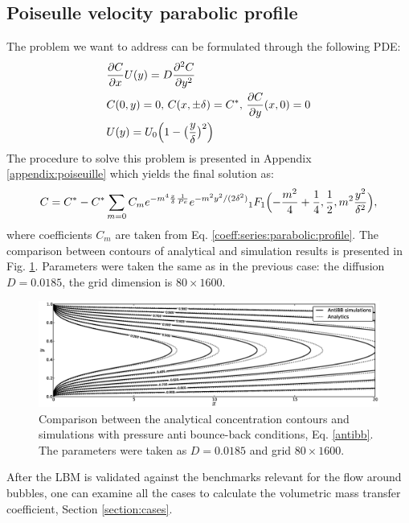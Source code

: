 \documentclass{article}
\newcommand{\beq}{\begin{equation}}
\newcommand{\feq}{\end{equation}}
\newcommand{\cstar}{C^{*}}
\begin{document}
\subsection{Poiseulle velocity parabolic profile}
The problem we want to address can be formulated through the following PDE:
\beq
\begin{aligned}
&\frac{\partial C}{\partial x} U(y)=D\frac{\partial^2 C}{\partial y^2}\\
&C(0,y)=0,\, C(x,\pm \delta)=\cstar,\, \frac{\partial C}{\partial y }(x,0)=0\\
&U(y)=U_0 \Bigl(1-\bigl(\frac{y}{\delta}\bigr)^2\Bigr)
\end{aligned}
\feq
The procedure to solve this problem is presented in Appendix \ref{appendix:poiseuille} which yields
the final solution as:
\begin{equation}
C=\cstar-\cstar \sum_{m=0}{C_m e^{-m^4 \frac{x}{\delta}\frac{1}{Pe}} e^{-m^2
y^2/(2\delta^2)}{_1F_1}\Bigl(-\frac{m^2}{4}+\frac{1}{4},\frac{1}{2},m^2 \frac{y^2}{\delta^2}\Bigr)},
\end{equation}
where coefficients $C_m$ are taken from Eq. \ref{coeff:series:parabolic:profile}. The comparison
between contours of analytical and simulation results is presented in Fig.
\ref{fig:parabolic:comparison}. Parameters were taken the same as in the previous case: the
diffusion $D=0.0185$, the grid dimension is $80\times1600$. 
\begin{figure}[htb!]
\includegraphics[width=\textwidth]{Figures/parabolic_profile_comparison.eps}
\caption{Comparison between the analytical concentration contours and simulations with pressure
anti bounce-back conditions, Eq. \ref{antibb}. The parameters were
taken as $D=0.0185$ and grid $80\times1600$. \label{fig:parabolic:comparison}}
\end{figure}

After the LBM is validated against the benchmarks relevant for the flow around bubbles, one can
examine all the cases to calculate the volumetric mass transfer coefficient, Section
\ref{section:cases}.
\end{document}
